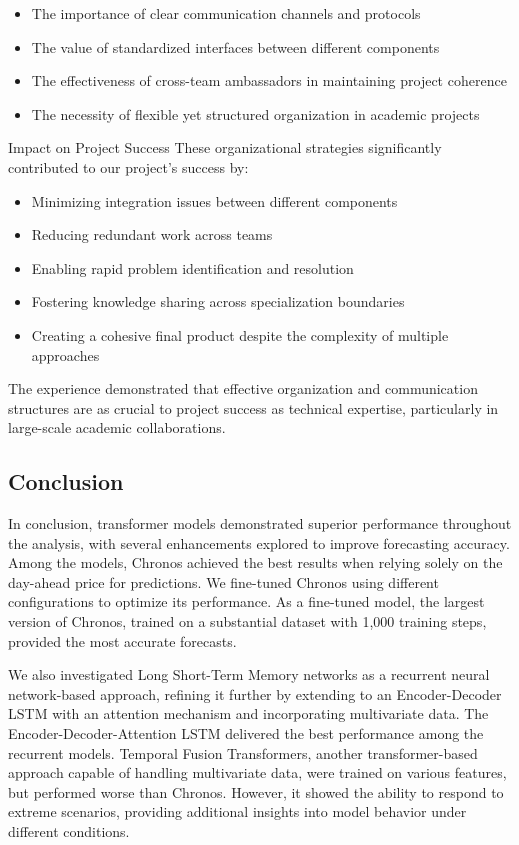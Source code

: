 \documentclass[a4paper]{article}
\providecommand{\tightlist}{%
      \setlength{\itemsep}{0pt}\setlength{\parskip}{0pt}}
\begin{document}
\begin{itemize}
\tightlist
\item
  The importance of clear communication channels and protocols
\item
  The value of standardized interfaces between different components
\item
  The effectiveness of cross-team ambassadors in maintaining project
  coherence
\item
  The necessity of flexible yet structured organization in academic
  projects
\end{itemize}

Impact on Project Success These organizational strategies significantly
contributed to our project's success by:

\begin{itemize}
\tightlist
\item
  Minimizing integration issues between different components
\item
  Reducing redundant work across teams
\item
  Enabling rapid problem identification and resolution
\item
  Fostering knowledge sharing across specialization boundaries
\item
  Creating a cohesive final product despite the complexity of multiple
  approaches
\end{itemize}

The experience demonstrated that effective organization and
communication structures are as crucial to project success as technical
expertise, particularly in large-scale academic collaborations.

    \subsection{Conclusion}\label{conclusion}

In conclusion, transformer models demonstrated superior performance
throughout the analysis, with several enhancements explored to improve
forecasting accuracy. Among the models, Chronos achieved the best
results when relying solely on the day-ahead price for predictions. We
fine-tuned Chronos using different configurations to optimize its
performance. As a fine-tuned model, the largest version of Chronos,
trained on a substantial dataset with 1,000 training steps, provided the
most accurate forecasts.

We also investigated Long Short-Term Memory networks as a recurrent
neural network-based approach, refining it further by extending to an
Encoder-Decoder LSTM with an attention mechanism and incorporating
multivariate data. The Encoder-Decoder-Attention LSTM delivered the best
performance among the recurrent models. Temporal Fusion Transformers,
another transformer-based approach capable of handling multivariate
data, were trained on various features, but performed worse than
Chronos. However, it showed the ability to respond to extreme scenarios,
providing additional insights into model behavior under different
conditions.
\end{document}
